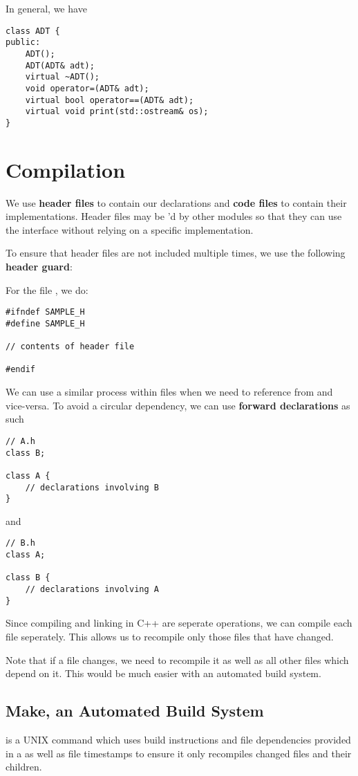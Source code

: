 \documentclass[12pt]{article}
\begin{document}
In general, we have
\begin{lstlisting}
class ADT {
public:
    ADT();
    ADT(ADT& adt);
    virtual ~ADT();
    void operator=(ADT& adt);
    virtual bool operator==(ADT& adt);
    virtual void print(std::ostream& os);
}
\end{lstlisting}

\section{Compilation}
We use {\bf header files} to contain our declarations and {\bf code files} to contain their implementations. Header files may be 'd by other modules so that they can use the interface without relying on a specific implementation.

To ensure that header files are not included multiple times, we use the following {\bf header guard}:

For the file , we do:
\begin{lstlisting}
#ifndef SAMPLE_H
#define SAMPLE_H

// contents of header file

#endif
\end{lstlisting}

We can use a similar process within files when we need to reference  from  and vice-versa. To avoid a circular dependency, we can use {\bf forward declarations} as such
\begin{lstlisting}
// A.h
class B;

class A {
    // declarations involving B
}
\end{lstlisting}
and
\begin{lstlisting}
// B.h
class A;

class B {
    // declarations involving A
}
\end{lstlisting}

Since compiling and linking in C++ are seperate operations, we can compile each file seperately. This allows us to recompile only those files that have changed.

Note that if a file changes, we need to recompile it as well as all other files which depend on it. This would be much easier with an automated build system.

\subsection{Make, an Automated Build System}
 is a UNIX command which uses build instructions and file dependencies provided in a  as well as file timestamps to ensure it only recompiles changed files and their children.
\end{document}
